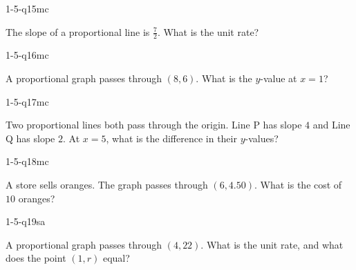 \begin{practiceQuestion}{1-5-q15}{mc}
\begin{questionText}
The slope of a proportional line is $\frac{7}{2}$. What is the unit rate?
\end{questionText}
\end{practiceQuestion}

\begin{practiceQuestion}{1-5-q16}{mc}
\begin{questionText}
A proportional graph passes through $(8, 6)$. What is the $y$-value at $x = 1$?
\end{questionText}
\end{practiceQuestion}

\begin{practiceQuestion}{1-5-q17}{mc}
\begin{questionText}
Two proportional lines both pass through the origin. Line P has slope $4$ and Line Q has slope $2$. At $x = 5$, what is the difference in their $y$-values?
\end{questionText}
\end{practiceQuestion}

\begin{practiceQuestion}{1-5-q18}{mc}
\begin{questionText}
A store sells oranges. The graph passes through $(6, 4.50)$. What is the cost of $10$ oranges?
\end{questionText}
\end{practiceQuestion}


\begin{practiceQuestion}{1-5-q19}{sa}
\begin{questionText}
A proportional graph passes through $(4, 22)$. What is the unit rate, and what does the point $(1, r)$ equal?
\end{questionText}
\end{practiceQuestion}

